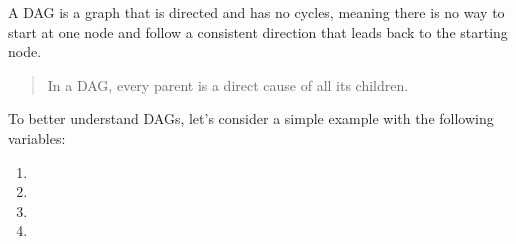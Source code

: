 \documentclass[letterpaper,10pt,english]{jupyterBook}
\begin{document}
\sphinxAtStartPar
A DAG is a graph that is directed and has no cycles, meaning there is no way to start at one node and follow a consistent direction that leads back to the starting node.
\begin{quote}

\sphinxAtStartPar
In a DAG, every parent is a direct cause of all its children.
\end{quote}

\sphinxAtStartPar
To better understand DAGs, let’s consider a simple example with the following variables:
\begin{enumerate}
%
\item {} 
\sphinxAtStartPar
{}

\item {} 
\sphinxAtStartPar
{}

\item {} 
\sphinxAtStartPar
{}

\item {} 
\sphinxAtStartPar
{}

\end{enumerate}
\end{document}
